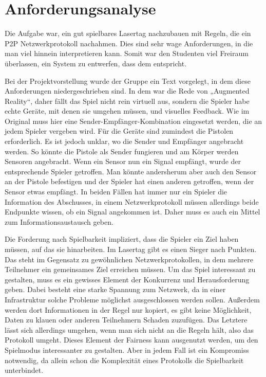 \section{Anforderungsanalyse}
\label{sec:anforderungsanalyse}

Die Aufgabe war, ein gut spielbares Lasertag nachzubauen mit Regeln, die ein
P2P Netzwerkprotokoll nachahmen. Dies sind sehr wage Anforderungen, in die man
viel hinnein interpretieren kann. Somit war den Studenten viel Freiraum
überlassen, ein System zu entwerfen, dass dem entspricht.

Bei der Projektvorstellung wurde der Gruppe ein Text vorgelegt, in dem diese
Anforderungen niedergeschrieben sind. In dem war die Rede von 
„Augmented Reality“, daher fällt das Spiel nicht rein virtuell aus, sondern
die Spieler habe echte Geräte, mit denen sie umgehen müssen, und visuelles
Feedback. Wie im Original muss hier eine Sender-Empfänger-Kombination
eingesetzt werden, die an jedem Spieler vergeben wird. Für die Geräte sind
zumindest die Pistolen erforderlich. Es ist jedoch unklar, wo die Sender und
Empfänger angebracht werden. So könnte die Pistole als Sender fungieren und
am Körper werden Sensoren angebracht. Wenn ein Sensor nun ein Signal empfängt,
wurde der entsprechende Spieler getroffen. Man könnte andersherum aber auch
den Sensor an der Pistole befestigen und der Spieler hat einen anderen
getroffen, wenn der Sensor etwas empfängt. In beiden Fällen hat immer nur ein
Spieler die Information des Abschusses, in einem Netzwerkprotokoll müssen
allerdings beide Endpunkte wissen, ob ein Signal angekommen ist. Daher muss
es auch ein Mittel zum Informationsaustausch geben.

Die Forderung nach Spielbarkeit impliziert, dass die Spieler ein Ziel haben
müssen, auf das sie hinarbeiten. Im Lasertag gibt es einen Sieger nach Punkten.
Das steht im Gegensatz zu gewöhnlichen Netzwerkprotokollen, in dem mehrere
Teilnehmer ein gemeinsames Ziel erreichen müssen. Um das Spiel interessant zu
gestalten, muss es ein gewisses Element der Konkurrenz und Herausforderung geben.
Dabei besteht eine starke Spannung zum Netzwerk, da in einer Infrastruktur
solche Probleme möglichst ausgeschlossen werden sollen. Außerdem werden dort
Informationen in der Regel nur kopiert, es gibt keine Möglichkeit, Daten zu
klauen oder anderen Teilnehmern Schaden zuzufügen. Das Letztere lässt sich
allerdings umgehen, wenn man sich nicht an die Regeln hält, also das Protokoll
umgeht. Dieses Element der Fairness kann ausgenutzt werden, um den Spielmodus
interessanter zu gestalten. Aber in jedem Fall ist ein Kompromiss notwendig,
da allein schon die Komplexität eines Protokolls die Spielbarkeit unterbindet.


